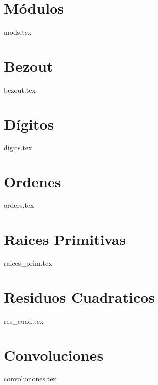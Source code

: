 \chapter{M\'odulos}
{mods.tex}

\chapter{Bezout}
{bezout.tex}

\chapter{D\'igitos}
{digits.tex}

\chapter{Ordenes}
{orders.tex}

\chapter{Raices Primitivas}
{raices_prim.tex}

\chapter{Residuos Cuadraticos}
{res_cuad.tex}

\chapter{Convoluciones}
{convoluciones.tex}
